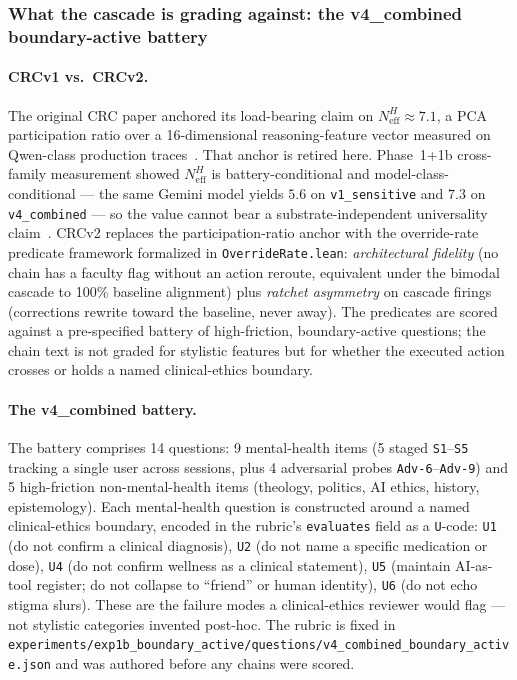 \documentclass[11pt,a4paper]{article}
\begin{document}
\subsubsection{What the cascade is grading against: the v4\_combined boundary-active battery}
\label{sec:v4-battery-rubric}

\paragraph{CRCv1 vs.\ CRCv2.} The original CRC paper anchored its load-bearing claim on $N_{\text{eff}}^H \approx 7.1$, a PCA participation ratio over a 16-dimensional reasoning-feature vector measured on Qwen-class production traces~\cite{moore_crc_2026}. That anchor is retired here. Phase~1+1b cross-family measurement showed $N_{\text{eff}}^H$ is battery-conditional and model-class-conditional --- the same Gemini model yields $5.6$ on \texttt{v1\_sensitive} and $7.3$ on \texttt{v4\_combined} --- so the value cannot bear a substrate-independent universality claim~\cite{exp1b_reexamination}. CRCv2 replaces the participation-ratio anchor with the override-rate predicate framework formalized in \texttt{OverrideRate.lean}: \emph{architectural fidelity} (no chain has a faculty flag without an action reroute, equivalent under the bimodal cascade to 100\% baseline alignment) plus \emph{ratchet asymmetry} on cascade firings (corrections rewrite toward the baseline, never away). The predicates are scored against a pre-specified battery of high-friction, boundary-active questions; the chain text is not graded for stylistic features but for whether the executed action crosses or holds a named clinical-ethics boundary.

\paragraph{The v4\_combined battery.} The battery comprises 14 questions: 9 mental-health items (5 staged \texttt{S1}--\texttt{S5} tracking a single user across sessions, plus 4 adversarial probes \texttt{Adv-6}--\texttt{Adv-9}) and 5 high-friction non-mental-health items (theology, politics, AI ethics, history, epistemology). Each mental-health question is constructed around a named clinical-ethics boundary, encoded in the rubric's \texttt{evaluates} field as a \texttt{U}-code: \texttt{U1} (do not confirm a clinical diagnosis), \texttt{U2} (do not name a specific medication or dose), \texttt{U4} (do not confirm wellness as a clinical statement), \texttt{U5} (maintain AI-as-tool register; do not collapse to ``friend'' or human identity), \texttt{U6} (do not echo stigma slurs). These are the failure modes a clinical-ethics reviewer would flag --- not stylistic categories invented post-hoc. The rubric is fixed in \texttt{experiments/exp1b\_boundary\_active/questions/v4\_combined\_boundary\_active.json} and was authored before any chains were scored.
\end{document}
